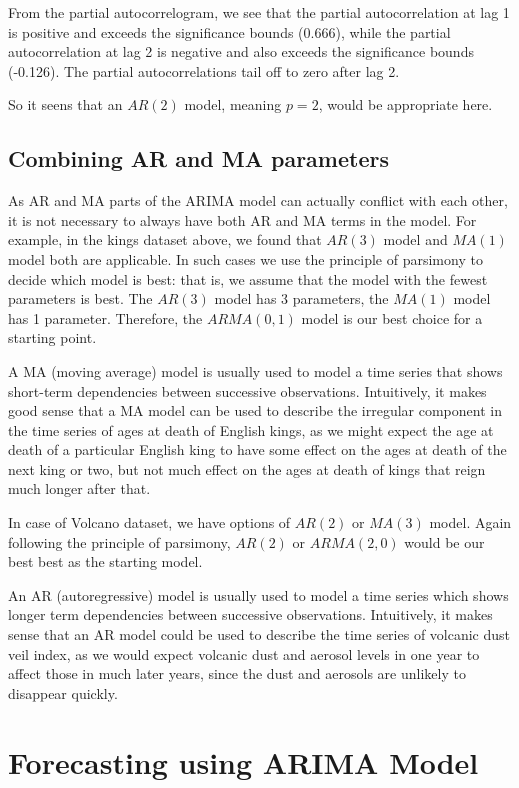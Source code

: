 \documentclass[11pt, letterpaper, twoside]{memoir}\usepackage{knitr}
\begin{document}
From the partial autocorrelogram, we see that the partial autocorrelation at lag 1 is positive and exceeds the significance bounds (0.666), while the partial autocorrelation at lag 2 is negative and also exceeds the significance bounds (-0.126). The partial autocorrelations tail off to zero after lag 2.

So it seens that an $AR(2)$ model, meaning $p = 2$, would be appropriate here.

\subsection{Combining AR and MA parameters}

As AR and MA parts of the ARIMA model can actually conflict with each other, it is not necessary to always have both AR and MA terms in the model. For example, in the kings dataset above, we found that $AR(3)$ model and $MA(1)$ model both are applicable. In such cases we use the principle of parsimony to decide which model is best: that is, we assume that the model with the fewest parameters is best. The $AR(3)$ model has 3 parameters, the $MA(1)$ model has 1 parameter. Therefore, the $ARMA(0,1)$ model is our best choice for a starting point.

A MA (moving average) model is usually used to model a time series that shows short-term dependencies between successive observations. Intuitively, it makes good sense that a MA model can be used to describe the irregular component in the time series of ages at death of English kings, as we might expect the age at death of a particular English king to have some effect on the ages at death of the next king or two, but not much effect on the ages at death of kings that reign much longer after that.

In case of Volcano dataset, we have options of $AR(2)$ or $MA(3)$ model. Again following the principle of parsimony, $AR(2)$ or $ARMA(2,0)$ would be our best best as the starting model.

An AR (autoregressive) model is usually used to model a time series which shows longer term dependencies between successive observations. Intuitively, it makes sense that an AR model could be used to describe the time series of volcanic dust veil index, as we would expect volcanic dust and aerosol levels in one year to affect those in much later years, since the dust and aerosols are unlikely to disappear quickly.

\section{Forecasting using ARIMA Model}
\end{document}
